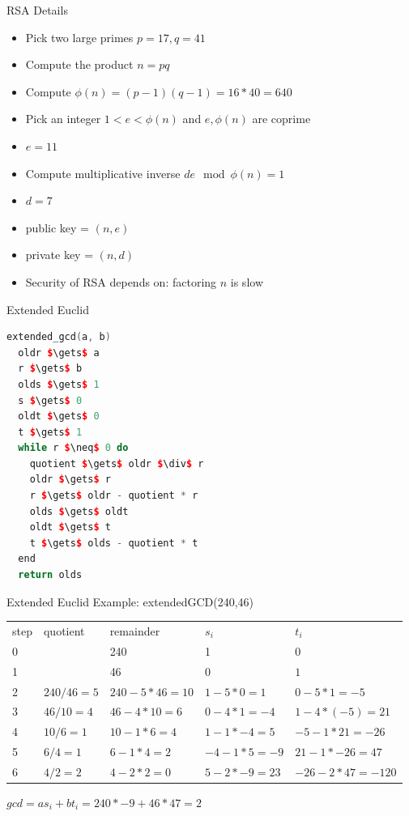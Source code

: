 \begin{frame}{RSA Details}
    \begin{itemize}
        \item Pick two large primes $p=17, q=41$
        \item Compute the product $n = p q$
        \item Compute $ \phi(n) = ( p-1 )( q-1 ) = 16*40 = 640$
        \item Pick an integer $1 < e < \phi(n)$ and $e, \phi(n)$ are coprime
        \item $e = 11$
        \item Compute multiplicative inverse $d e \mod \phi(n) = 1$
        \item $d = 7$
        \item public key = $( n, e )$
        \item private key = $( n, d )$
        \item Security of RSA depends on: factoring $n$ is slow
    \end{itemize}
\end{frame}

\begin{frame}[fragile]{Extended Euclid}
\begin{lstlisting}[language=c++,mathescape=true]
extended_gcd(a, b)
  oldr $\gets$ a
  r $\gets$ b
  olds $\gets$ 1
  s $\gets$ 0
  oldt $\gets$ 0
  t $\gets$ 1
  while r $\neq$ 0 do
    quotient $\gets$ oldr $\div$ r
    oldr $\gets$ r
    r $\gets$ oldr - quotient * r
    olds $\gets$ oldt
    oldt $\gets$ t
    t $\gets$ olds - quotient * t
  end
  return olds
\end{lstlisting}    
\end{frame}

\begin{frame}[fragile]{Extended Euclid}
    Example: extendedGCD(240,46)
\begin{tabular}{p{0.8cm}|p{2cm}|p{2cm}|p{2cm}|p{2cm}} %
step & quotient       & remainder            & $s_i$            & $t_i$             \\     
0    &                & 240                  & 1                & $0$               \\ 
1    &                & 46                  & $0$               & $1$               \\   
2    & $240 / 46 = 5$ & $240 - 5 * 46 = 10$ & $1 - 5*0 = 1$     & $0 - 5*1 = -5$    \\ 
3    & $46 / 10 = 4$  & $46 - 4 * 10 = 6$   & $0 - 4*1 = -4$    & $1 - 4*(-5) = 21$ \\
4    & $10 / 6 = 1$   & $10 - 1 * 6 = 4$    & $1 - 1*-4 = 5$    & $-5 - 1*21 = -26$ \\
5    & $6 / 4 = 1$    & $6 - 1 * 4 = 2$     & $-4 -1*5 = -9$    & $21 - 1*-26 = 47$ \\
6    & $4 / 2 = 2$    & $4 - 2 * 2 = 0$     & $5 - 2*-9 = 23$ & $-26 - 2*47 = -120$ \\
\end{tabular}
$gcd = a s_i + b t_i = 240*-9 + 46*47 = 2$
\end{frame}

